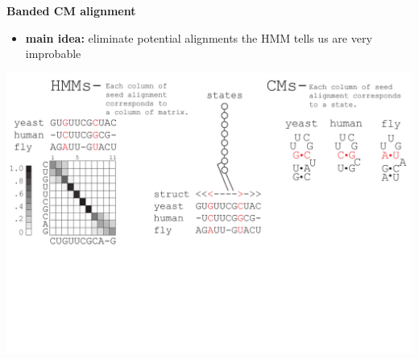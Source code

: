 \documentclass[landscape]{slides}
\begin{document}
\begin{slide}
\begin{center}
\large
\textbf{Banded CM alignment}
\end{center}
\medskip
\small
\begin{itemize}
\item
\textbf{main idea:} eliminate potential alignments the HMM tells us are very improbable
\end{itemize}
\begin{center}
\includegraphics[width=8in]{figs/post_hmm_to_cm_map2_layer4}
\end{center}
\vfill
\end{slide}
\end{document}
